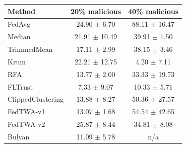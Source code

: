\begin{tabular}{lcc}
\toprule
Method & 20\% malicious & 40\% malicious \\
\midrule
FedAvg & 24.90 $\pm$ 6.70 & 88.11 $\pm$ 16.47 \\
Median & 21.91 $\pm$ 10.49 & 39.91 $\pm$ 1.50 \\
TrimmedMean & 17.11 $\pm$ 2.99 & 38.15 $\pm$ 3.46 \\
Krum & 22.21 $\pm$ 12.75 & 4.20 $\pm$ 7.11 \\
RFA & 13.77 $\pm$ 2.00 & 33.33 $\pm$ 19.73 \\
FLTrust & 7.33 $\pm$ 9.07 & 10.33 $\pm$ 5.71 \\
ClippedClustering & 13.88 $\pm$ 8.27 & 50.36 $\pm$ 27.57 \\
FedTWA-v1 & 13.07 $\pm$ 1.68 & 54.54 $\pm$ 42.65 \\
FedTWA-v2 & 25.87 $\pm$ 8.44 & 34.81 $\pm$ 8.08 \\
Bulyan & 11.09 $\pm$ 5.78 & n/a \\
\bottomrule
\end{tabular}